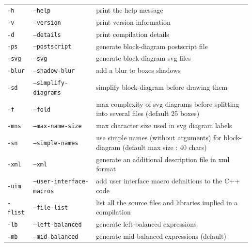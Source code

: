 \documentclass[a4paper,10pt]{book}
\begin{document}
\tablelasttail{
  \hline
}


\begin{supertabular}{|p{1.5cm}|p{4cm}|p{5cm}|}  
\texttt{-h} 				& \texttt{--help} 					& print the help message  \\
\texttt{-v} 				& \texttt{--version} 				& print version information  \\
\texttt{-d} 				& \texttt{--details} 				& print compilation details  \\
\texttt{-ps} 				& \texttt{--postscript} 			& generate block-diagram postscript file  \\
\texttt{-svg} 				& \texttt{--svg} 					& generate block-diagram svg files  \\
\texttt{-blur} 				& \texttt{--shadow-blur} 			& add a blur to boxes shadows  \\
\texttt{-sd} 				& \texttt{--simplify-diagrams} 		& simplify block-diagram before drawing them  \\
\texttt{-f } 		& \texttt{--fold }  		& max complexity of svg diagrams before splitting into several files (default 25 boxes)  \\
\texttt{-mns } 		& \texttt{--max-name-size } & max character size used in svg diagram labels\\
\texttt{-sn}             	& \texttt{--simple-names}			& use simple names (without arguments) for block-diagram (default max size : 40 chars) \\
\texttt{-xml} 				& \texttt{--xml} 					& generate an additional description file in xml format  \\
\texttt{-uim} 				& \texttt{--user-interface-macros} 	& add user interface macro definitions to the C++ code  \\
\texttt{-flist} 			& \texttt{--file-list} 				& list all the source files and libraries implied in a compilation  \\
\hline
\texttt{-lb}	 			& \texttt{--left-balanced} 			& generate left-balanced expressions  \\
\texttt{-mb} 				& \texttt{--mid-balanced} 			& generate mid-balanced expressions (default)  \\

\end{supertabular}
\end{document}
